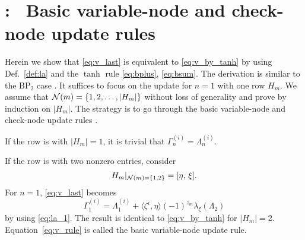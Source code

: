 \documentclass{ieeeaccess}
\newcommand{\sN}{{\cal N}}
\theoremstyle{definition}		%
\begin{document}



\appendices		%


\section{:~ Basic variable-node and check-node update rules} \label{sec:bp_rule}


Herein we show that \eqref{eq:v_last} is equivalent to \eqref{eq:v_by_tanh} by using Def.~\ref{def:la} and  the $\tanh$ rule \eqref{eq:bplus}, \eqref{eq:bsum}. The derivation is similar to the BP$_2$ case \mbox{\cite[Sec.~2.5.2]{RU08}}. %
It suffices to focus on the update for $n=1$ with one row $H_m$. 
We assume that $\sN(m) = \{1,2,\dots,|H_m|\}$ without loss of generality and prove by induction on $|H_m|$.
The strategy is to go through the basic variable-node and check-node update  rules \mbox{\cite[Sec.~V-E]{KFL01}}.


If the row is with $|H_m|=1$, it is trivial that $\Gamma_{n}^{(i)} = \Lambda_{n}^{(i)}$.


If the row is with two nonzero entries, consider
	$$H_m|_{\sN(m)=\{1,2\}}=[\eta,\, \xi].$$ 
For $n=1$, \eqref{eq:v_last} becomes 
	\begin{equation} \label{eq:v_rule}
	\Gamma_1^{(i)} = \Lambda_1^{(i)} + \langle \zeta^i, \eta \rangle (-1)^{z_m} \lambda_{\xi}(\Lambda_{2})
	\end{equation}
by using \eqref{eq:la_1}. 
The result is identical to \eqref{eq:v_by_tanh} for $|H_m|=2$.
Equation~\eqref{eq:v_rule} is called the basic {variable-node update rule}. 
\end{document}
